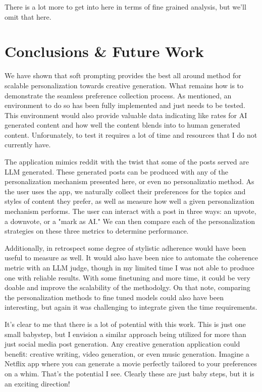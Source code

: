 \documentclass[11pt]{article}
\begin{document}
There is a lot more to get into here in terms of fine grained analysis, but we'll omit that here.

\section{Conclusions \& Future Work}

We have shown that soft prompting provides the best all around method for scalable personalization towards creative generation. What remains how is to demonstrate the seamless preference collection process. As mentioned, an environment to do so has been fully implemented and just needs to be tested. This environment would also provide valuable data indicating like rates for AI generated content and how well the content blends into to human generated content. Unforunately, to test it requires a lot of time and resources that I do not currently have. 

The application mimics reddit with the twist that some of the posts served are LLM generated. These generated posts can be produced with any of the personalization mechanism presented here, or even no personalizatio method. As the user uses the app, we naturally collect their preferences for the topics and styles of content they prefer, as well as measure how well a given personalization mechanism performs. The user can interact with a post in three ways: an upvote, a downvote, or a "mark as AI." We can then compare each of the personalization strategies on these three metrics to determine performance.

Additionally, in retrospect some degree of stylistic adherence would have been useful to measure as well. It would also have been nice to automate the coherence metric with an LLM judge, though in my limited time I was not able to produce one with reliable results. With some finetuning and more time, it could be very doable and improve the scalability of the methodolgy. On that note, comparing the personalization methods to fine tuned models could also have been interesting, but again it was challenging to integrate given the time requirements. 

It's clear to me that there is a lot of potential with this work. This is just one small babystep, but I envision a similar approach being utilized for more than just social media post generation. Any creative generation application could benefit: creative writing, video generation, or even music generation. Imagine a Netflix app where you can generate a movie perfectly tailored to your preferences on a whim. That's the potential I see. Clearly these are just baby steps, but it is an exciting direction!
\end{document}

